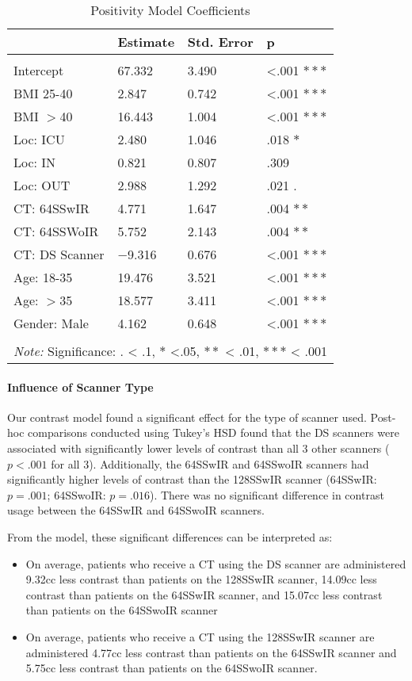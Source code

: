 \documentclass[]{article}
\let\oldparagraph\paragraph
\renewcommand{\paragraph}[1]{\oldparagraph{#1}\mbox{}}
\begin{document}
\begin{table}[H] \centering 
  \caption{Positivity Model Coefficients} 
\begin{tabular}{p{3cm}|p{3cm}p{3cm}p{3cm}}
\\[-1.8ex] \hline 
\hline
 & Estimate & Std. Error & p  \\
\hline \\[-1.8ex] 
 Intercept   & 67.332 & 3.490 & <.001 $***$ \\
 BMI 25-40   & 2.847 & 0.742 & <.001 $***$\\
 BMI $>$40   & 16.443 & 1.004 & <.001 $***$\\
 Loc: ICU    & 2.480 & 1.046 & .018 $*$\\
 Loc: IN     & 0.821 & 0.807 & .309 \\
 Loc: OUT    & 2.988 & 1.292 & .021 $.$\\
 CT: 64SSwIR & 4.771 & 1.647 & .004 $**$\\
 CT: 64SSWoIR & 5.752 & 2.143 & .004 $**$ \\
 CT: DS Scanner & $-$9.316 & 0.676 & <.001 $***$\\
 Age: 18-35 & 19.476 & 3.521 & <.001 $***$\\
 Age: $>$35 & 18.577 & 3.411 & <.001 $***$ \\
 Gender: Male & 4.162 & 0.648 & <.001 $***$ \\
\hline 
\hline \\[-1.8ex]
\multicolumn{4}{l}{\textit{Note:} Significance: $.$ < .1, $*$ <.05, $**$ < .01, $***$ < .001}
 \end{tabular}
\end{table}

\paragraph{Influence of Scanner Type}\label{influence-of-scanner-type}

Our contrast model found a significant effect for the type of scanner
used. Post-hoc comparisons conducted using Tukey's HSD found that the DS
scanners were associated with significantly lower levels of contrast
than all 3 other scanners (\(p<.001\) for all 3). Additionally, the
64SSwIR and 64SSwoIR scanners had significantly higher levels of
contrast than the 128SSwIR scanner (64SSwIR: \(p = .001\); 64SSwoIR:
\(p = .016\)). There was no significant difference in contrast usage
between the 64SSwIR and 64SSwoIR scanners.

From the model, these significant differences can be interpreted as:

\begin{itemize}
\item On average, patients who receive a CT using the DS scanner are administered 9.32cc less contrast than patients on the 128SSwIR scanner, 14.09cc less contrast than patients on the 64SSwIR scanner, and 15.07cc less contrast than patients on the 64SSwoIR scanner
\item On average, patients who receive a CT using the 128SSwIR scanner are administered 4.77cc less contrast than patients on the 64SSwIR scanner and 5.75cc less contrast than patients on the 64SSwoIR scanner.
\end{itemize}
\end{document}
